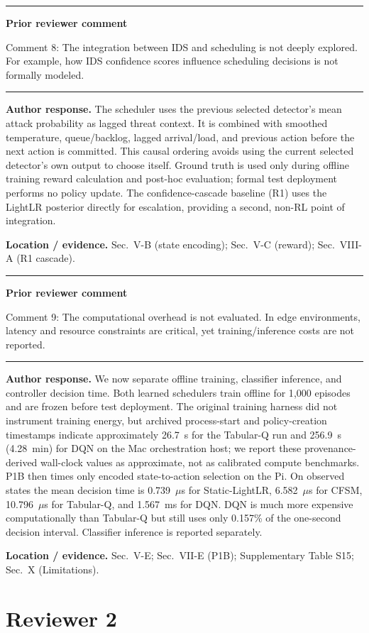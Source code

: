 \documentclass[11pt]{article}
\newenvironment{qbox}
    {\par\vspace{4pt}\noindent\begin{minipage}{\linewidth}\rule{\linewidth}{0.4pt}\par\noindent\textbf{Prior reviewer comment}\par\noindent}
    {\par\rule{\linewidth}{0.4pt}\end{minipage}\par\vspace{4pt}}
\begin{document}
\begin{qbox}
Comment 8: The integration between IDS and scheduling is not deeply explored. For example, how IDS confidence scores influence scheduling decisions is not formally modeled.
\end{qbox}

\textbf{Author response.} The scheduler uses the previous selected detector's mean attack probability as lagged threat context. It is combined with smoothed temperature, queue/backlog, lagged arrival/load, and previous action before the next action is committed. This causal ordering avoids using the current selected detector's own output to choose itself. Ground truth is used only during offline training reward calculation and post-hoc evaluation; formal test deployment performs no policy update. The confidence-cascade baseline (R1) uses the LightLR posterior directly for escalation, providing a second, non-RL point of integration.

\textbf{Location / evidence.} Sec.~V-B (state encoding); Sec.~V-C (reward); Sec.~VIII-A (R1 cascade).

\begin{qbox}
Comment 9: The computational overhead is not evaluated. In edge environments, latency and resource constraints are critical, yet training/inference costs are not reported.
\end{qbox}

\textbf{Author response.} We now separate offline training, classifier inference, and controller decision time. Both learned schedulers train offline for 1{,}000 episodes and are frozen before test deployment. The original training harness did not instrument training energy, but archived process-start and policy-creation timestamps indicate approximately 26.7~s for the Tabular-Q run and 256.9~s (4.28~min) for DQN on the Mac orchestration host; we report these provenance-derived wall-clock values as approximate, not as calibrated compute benchmarks. P1B then times only encoded state-to-action selection on the Pi. On observed states the mean decision time is 0.739~$\mu$s for Static-LightLR, 6.582~$\mu$s for CFSM, 10.796~$\mu$s for Tabular-Q, and 1.567~ms for DQN. DQN is much more expensive computationally than Tabular-Q but still uses only 0.157\% of the one-second decision interval. Classifier inference is reported separately.

\textbf{Location / evidence.} Sec.~V-E; Sec.~VII-E (P1B); Supplementary Table S15; Sec.~X (Limitations).

\section*{Reviewer 2}
\end{document}
